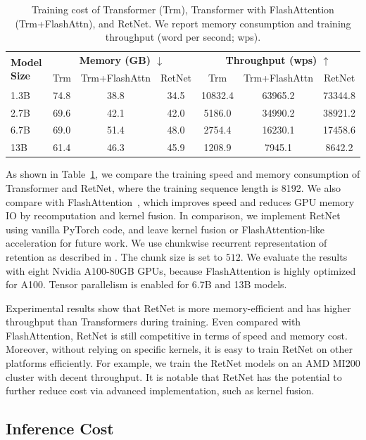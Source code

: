 \documentclass{article}
\newcommand\our{RetNet}
\begin{document}
\begin{table}[t]
\centering
\begin{tabular}{l ccc ccc}
\toprule
\multirow{2}{*}{\textbf{Model Size}} & \multicolumn{3}{c|}{\bf Memory (GB) $\downarrow$} & \multicolumn{3}{c}{\bf Throughput (wps) $\uparrow$} \\
 & Trm & Trm+FlashAttn & \our{} & Trm & Trm+FlashAttn & \our{} \\
\midrule
1.3B & 74.8 & 38.8 & 34.5 & 10832.4 & 63965.2 & 73344.8 \\
2.7B & 69.6 & 42.1 & 42.0 & 5186.0 & 34990.2 & 38921.2 \\
6.7B & 69.0 & 51.4 & 48.0 & 2754.4 & 16230.1 & 17458.6 \\
13B  & 61.4 & 46.3 & 45.9 & 1208.9 & 7945.1 & 8642.2 \\
\bottomrule
\end{tabular}
\caption{Training cost of Transformer (Trm), Transformer with FlashAttention (Trm+FlashAttn), and \our{}. We report memory consumption and training throughput (word per second; wps).}
\label{tbl:traincost}
\end{table}

As shown in Table~\ref{tbl:traincost}, we compare the training speed and memory consumption of Transformer and \our{}, where the training sequence length is 8192.
We also compare with FlashAttention~\cite{flashattention}, which improves speed and reduces GPU memory IO by recomputation and kernel fusion.
In comparison, we implement \our{} using vanilla PyTorch code, and leave kernel fusion or FlashAttention-like acceleration for future work.
We use chunkwise recurrent representation of retention as described in . The chunk size is set to $512$.
We evaluate the results with eight Nvidia A100-80GB GPUs, because FlashAttention is highly optimized for A100.
Tensor parallelism is enabled for 6.7B and 13B models.

Experimental results show that \our{} is more memory-efficient and has higher throughput than Transformers during training.
Even compared with FlashAttention, \our{} is still competitive in terms of speed and memory cost.
Moreover, without relying on specific kernels, it is easy to train \our{} on other platforms efficiently. For example, we train the \our{} models on an AMD MI200 cluster with decent throughput.
It is notable that \our{} has the potential to further reduce cost via advanced implementation, such as kernel fusion.


\subsection{Inference Cost}
\label{sec:inference:cost}
\end{document}
